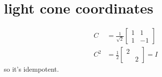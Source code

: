 \documentclass{scrartcl}
\begin{document}
\section{light cone coordinates}
\begin{multicols*}{2}
  \begin{align*}
    C &= \frac1{\sqrt 2}
        \begin{bmatrix}
          1 & 1 \\ 1 & -1
        \end{bmatrix} \\
    C^2&= \frac12
         \begin{bmatrix}
           2 \\ & 2
         \end{bmatrix} = I
  \end{align*}
  so it's idempotent.


\end{multicols*}
\end{document}
